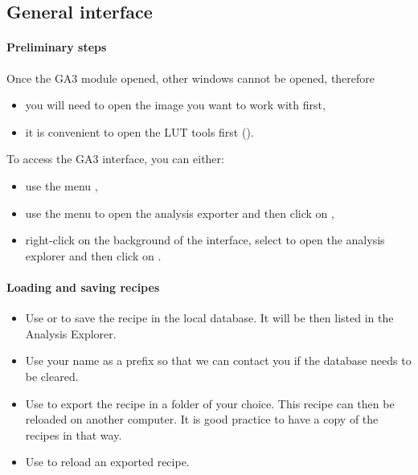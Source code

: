 

\subsection{General interface}

\paragraph{Preliminary steps}
Once the GA3 module opened, other windows cannot be opened, therefore
\begin{itemize}
    \item you will need to open the image you want to work with first,
    \item it is convenient to open the LUT tools first ().
\end{itemize}
To access the GA3 interface, you can either:
\begin{itemize}
    \item use the menu ,
    \item use the menu  to open the analysis exporter and then click on ,
    \item right-click on the background of the interface, select  to open the analysis explorer and then click on .
\end{itemize}

\paragraph{Loading and saving recipes}

\begin{itemize}
    \item Use  or  to save the recipe in the local database. It will be then listed in the Analysis Explorer.
    \item Use your name as a prefix so that we can contact you if the database needs to be cleared.
    \item Use  to export the recipe in a folder of your choice. This recipe can then be reloaded on another computer. It is good practice to have a copy of the recipes in that way.
    \item Use  to reload an exported recipe. 
\end{itemize}

